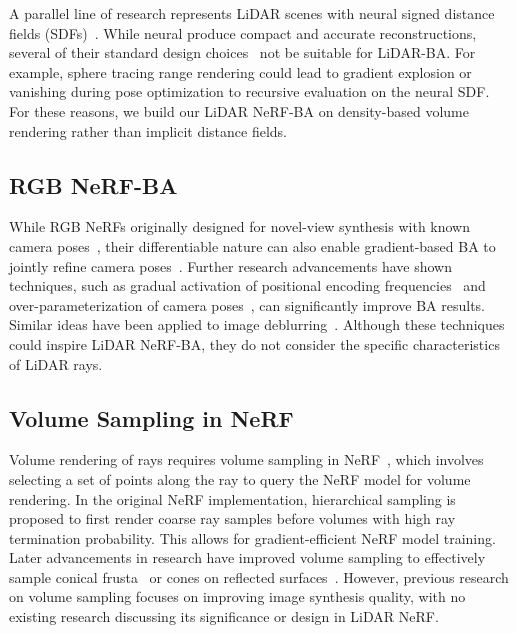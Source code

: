 A parallel line of research represents LiDAR scenes with neural signed distance fields (SDFs)~. While neural  produce compact and accurate reconstructions, several of their standard design choices~\cite{takikawa2021neuralsdf}  not be suitable for LiDAR-BA. For example, sphere tracing range rendering could lead to gradient explosion or vanishing during pose optimization  to recursive evaluation on the neural SDF. For these reasons, we build our LiDAR NeRF-BA on density-based volume rendering rather than implicit distance fields.

\subsection{RGB NeRF-BA}
While RGB NeRFs  originally designed for novel-view synthesis with known camera poses~\cite{mildenhall2020nerfOG}, their differentiable nature can also enable gradient-based BA to jointly refine camera poses~\cite{wang2022nerfmm,bian2023nopenerf}. Further research advancements have shown techniques, such as gradual activation of positional encoding frequencies~\cite{lin2021barf} and over-parameterization of camera poses~\cite{chen2023l2gnerf}, can significantly improve BA results. Similar ideas have been applied to image deblurring~\cite{wang2023badnerf}. Although these techniques could inspire LiDAR NeRF-BA, they do not consider the specific characteristics of LiDAR rays.

\subsection{Volume Sampling in NeRF}
Volume rendering of rays requires volume sampling in NeRF~\cite{mildenhall2020nerfOG}, which involves selecting a set of points along the ray to query the NeRF model for volume rendering. In the original NeRF implementation, hierarchical sampling is proposed to first render coarse ray samples before  volumes with high ray termination probability. This allows for gradient-efficient NeRF model training. Later advancements in research have improved volume sampling to effectively sample conical frusta~\cite{barron2021mipnerf,barron2023zipnerf} or cones on reflected surfaces~\cite{verbin2024nerfcasting}. However, previous research on volume sampling focuses on improving image synthesis quality, with no existing research discussing its significance or design in LiDAR NeRF.

